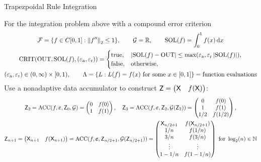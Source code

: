 \documentclass[10pt,compress,xcolor={usenames,dvipsnames},aspectratio=169]{beamer}
\DeclareMathOperator{\DATA}{ACC}
\DeclareMathOperator{\SOL}{SOL}
\DeclareMathOperator{\OUT}{OUT}
\DeclareMathOperator{\CRIT}{CRIT}
\newcommand{\ttrue}{\text{true}}
\newcommand{\tfalse}{\text{false}}
\newcommand{\tolabs}{\varepsilon_{\text{a}}}
\newcommand{\tolrel}{\varepsilon_{\text{r}}}
\begin{document}
\begin{frame}{Trapezpoidal Rule Integration}

\vspace{-2ex}
For the integration problem above with a \alert{compound error criterion}
\vspace{-1ex}
\begin{gather*}
	\cf = \{f \in C[0,1] : \norm[2]{f''} \le 1\}, \qquad 
	\cg  = \reals,  \qquad
	\SOL(f) = \int_0^1 f(x) \, \dif x  \\
	\CRIT(\OUT, \SOL(f),(\tolabs, \tolrel))  = \begin{cases} \ttrue, & \abs{\SOL(f) - \OUT} \le \max(\tolabs,\tolrel \abs{\SOL(f)}), \\
		\tfalse, & \text{otherwise}, 
		\end{cases} \\
	 (\tolabs,\tolrel) \in (0,\infty) \times [0,1), \qquad
	 \Lambda  = \{L :  L(f) = f(x) \text{ for some } x \in [0,1]\} = \text{function evaluations}
\end{gather*}
Use a \alert{nonadaptive} data accumulator to construct $\mathsf{Z} = \begin{pmatrix} \mathsf{X} & f(\mathsf{X}) \end{pmatrix}$:
\vspace{-1ex}
\begin{gather*}
\mZ_2 = \DATA(f,\veps,\mZ_{0},\cg)  = \begin{pmatrix} 0 & f(0) \\ 1 & f(1) \end{pmatrix},  \quad
\mZ_3 = \DATA(f,\veps,\mZ_{2},\cg(\mZ_{2})) = \begin{pmatrix} 0 & f(0) \\ 1 & f(1) \\ 1/2 & f(1/2)\end{pmatrix}, \\
	\mZ_{n+1} =  \begin{pmatrix} \mX_{n+1} & f(\mX_{n+1}) \end{pmatrix} = \DATA(f,\veps,\mZ_{n/2+1},\cg(\mZ_{n/2+1})) = \begin{pmatrix} \mX_{n/2+1} & f(\mX_{n/2+1}) \\ 1/n& f(1/n) \\ 3/n & f(3/n) \\ \vdots & \vdots \\ 1 - 1/n & f(1 - 1/n)\end{pmatrix}  \text{ for } \log_2(n) \in \naturals
\end{gather*}

\end{frame}
\end{document}
